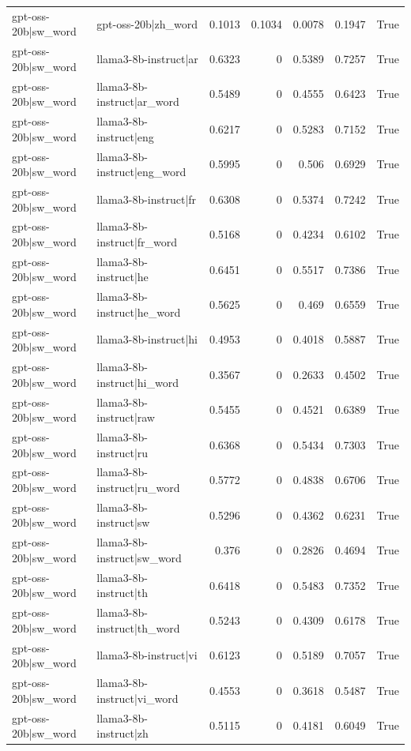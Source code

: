 \begin{table}
\begin{tabular}{l l r r r r l}
gpt-oss-20b|sw_word & gpt-oss-20b|zh_word & 0.1013 & 0.1034 & 0.0078 & 0.1947 & True \\
gpt-oss-20b|sw_word & llama3-8b-instruct|ar & 0.6323 & 0 & 0.5389 & 0.7257 & True \\
gpt-oss-20b|sw_word & llama3-8b-instruct|ar_word & 0.5489 & 0 & 0.4555 & 0.6423 & True \\
gpt-oss-20b|sw_word & llama3-8b-instruct|eng & 0.6217 & 0 & 0.5283 & 0.7152 & True \\
gpt-oss-20b|sw_word & llama3-8b-instruct|eng_word & 0.5995 & 0 & 0.506 & 0.6929 & True \\
gpt-oss-20b|sw_word & llama3-8b-instruct|fr & 0.6308 & 0 & 0.5374 & 0.7242 & True \\
gpt-oss-20b|sw_word & llama3-8b-instruct|fr_word & 0.5168 & 0 & 0.4234 & 0.6102 & True \\
gpt-oss-20b|sw_word & llama3-8b-instruct|he & 0.6451 & 0 & 0.5517 & 0.7386 & True \\
gpt-oss-20b|sw_word & llama3-8b-instruct|he_word & 0.5625 & 0 & 0.469 & 0.6559 & True \\
gpt-oss-20b|sw_word & llama3-8b-instruct|hi & 0.4953 & 0 & 0.4018 & 0.5887 & True \\
gpt-oss-20b|sw_word & llama3-8b-instruct|hi_word & 0.3567 & 0 & 0.2633 & 0.4502 & True \\
gpt-oss-20b|sw_word & llama3-8b-instruct|raw & 0.5455 & 0 & 0.4521 & 0.6389 & True \\
gpt-oss-20b|sw_word & llama3-8b-instruct|ru & 0.6368 & 0 & 0.5434 & 0.7303 & True \\
gpt-oss-20b|sw_word & llama3-8b-instruct|ru_word & 0.5772 & 0 & 0.4838 & 0.6706 & True \\
gpt-oss-20b|sw_word & llama3-8b-instruct|sw & 0.5296 & 0 & 0.4362 & 0.6231 & True \\
gpt-oss-20b|sw_word & llama3-8b-instruct|sw_word & 0.376 & 0 & 0.2826 & 0.4694 & True \\
gpt-oss-20b|sw_word & llama3-8b-instruct|th & 0.6418 & 0 & 0.5483 & 0.7352 & True \\
gpt-oss-20b|sw_word & llama3-8b-instruct|th_word & 0.5243 & 0 & 0.4309 & 0.6178 & True \\
gpt-oss-20b|sw_word & llama3-8b-instruct|vi & 0.6123 & 0 & 0.5189 & 0.7057 & True \\
gpt-oss-20b|sw_word & llama3-8b-instruct|vi_word & 0.4553 & 0 & 0.3618 & 0.5487 & True \\
gpt-oss-20b|sw_word & llama3-8b-instruct|zh & 0.5115 & 0 & 0.4181 & 0.6049 & True \\

\end{tabular}
\end{table}
